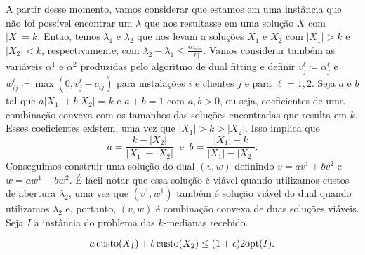 A partir desse momento, vamos considerar que estamos em uma instância que não foi possível encontrar um $\lambda$ que nos resultasse em uma solução $X$ com $|X| = k$. Então, temos $\lambda_1$ e $\lambda_2$ que nos levam a soluções $X_1$ e $X_2$ com $|X_1| > k$ e $|X_2| < k$, respectivamente, com $\lambda_2 - \lambda_1 \leq \frac{\epsilon c_{\min}}{|F|}$. Vamos considerar também as variáveis $\alpha^1$ e $\alpha^2$ produzidas pelo algoritmo de dual fitting e definir $v_j^\ell \coloneqq \alpha_j^\ell$ e $w_{ij}^\ell \coloneqq \max(0,v_j^\ell - c_{ij})$ para instalações $i$ e clientes $j$ e para $\ell = 1,2$. Seja $a$ e $b$ tal que $a|X_1| + b|X_2| = k$ e $a + b = 1$ com $a,b>0$, ou seja, coeficientes de uma combinação convexa com os tamanhos das soluções encontradas que resulta em $k$. Esses coeficientes existem, uma vez que $|X_1| > k > |X_2|$. Isso implica que 
\[ a = \frac{k - |X_2|}{|X_1| - |X_2|} \ \text{ e }\ b = \frac{|X_1| - k}{|X_1| - |X_2|}.\]
Conseguimos construir uma solução do dual $(v,w)$ definindo ${v = av^1 + bv^2}$ e ${w = aw^1 + bw^2}$. É fácil notar que essa solução é viável quando utilizamos custos de abertura $\lambda_2$, uma vez que $(v^1,w^1)$ também é solução viável do dual quando utilizamos $\lambda_2$ e, portanto, $(v,w)$ é combinação convexa de duas soluções viáveis. Seja $I$ a instância do problema das $k$-medianas recebido. 
\begin{lemma}
    \label{k-median_relLag_lema1}
    \[a \, \mathrm{custo}(X_1) + b \,\mathrm{custo}(X_2) \leq (1+\epsilon) 2\mathrm{opt}(I).\]
\end{lemma}
